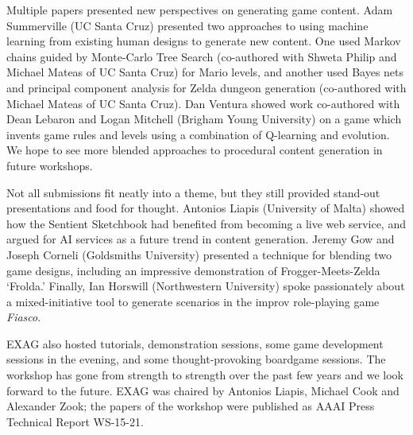 \documentclass[10pt,letterpaper]{article}
\begin{document}
Multiple papers presented new perspectives on generating game content.
Adam Summerville (UC Santa Cruz) presented two approaches to using machine learning from existing human designs to generate new content.
One used Markov chains guided by Monte-Carlo Tree Search (co-authored with Shweta Philip and Michael Mateas of UC Santa Cruz) for Mario levels, and another used Bayes nets and principal component analysis for Zelda dungeon generation (co-authored with Michael Mateas of UC Santa Cruz).
Dan Ventura showed work co-authored with Dean Lebaron and Logan Mitchell (Brigham Young University) on a game which invents game rules and levels using a combination of Q-learning and evolution.
We hope to see more blended approaches to procedural content generation in future workshops.

Not all submissions fit neatly into a theme, but they still provided stand-out presentations and food for thought.
Antonios Liapis (University of Malta) showed how the Sentient Sketchbook had benefited from becoming a live web service, and argued for AI services as a future trend in content generation.
Jeremy Gow and Joseph Corneli (Goldsmiths University) presented a technique for blending two game designs, including an impressive demonstration of Frogger-Meets-Zelda `Frolda.'
Finally, Ian Horswill (Northwestern University) spoke passionately about a mixed-initiative tool to generate scenarios in the improv role-playing game \textit{Fiasco}.

EXAG also hosted tutorials, demonstration sessions, some game development sessions in the evening, and some thought-provoking boardgame sessions.
The workshop has gone from strength to strength over the past few years and we look forward to the future.
EXAG was chaired by Antonios Liapis, Michael Cook and Alexander Zook; the papers of the workshop were published as AAAI Press Technical Report WS-15-21.
\end{document}
